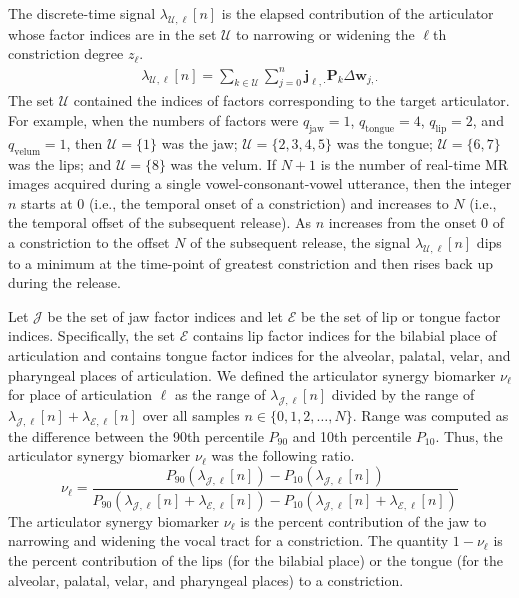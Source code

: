 \documentclass[preprint]{JASAnew}\usepackage[]{graphicx}\usepackage[]{color}
\begin{document}
The discrete-time signal $\lambda_{\mathcal{U},\ell}[n]$ is the elapsed contribution of the articulator whose factor indices are in the set $\mathcal{U}$ to narrowing or widening the $\ell$th constriction degree $z_\ell$. 
\begin{align}
\lambda_{\mathcal{U},\ell} \left[ n \right]
	= \sum_{k\in \mathcal{U}} \sum_{j=0}^{n} \mathbf{j}_{\ell,\cdot} \mathbf{P}_k \Delta \mathbf{w}_{j,\cdot}
\end{align}
The set $\mathcal{U}$ contained the indices of factors corresponding to the target articulator. For example, when the numbers of factors were $q_\text{jaw} = 1$, $q_\text{tongue} = 4$, $q_\text{lip} = 2$, and $q_\text{velum} = 1$, then  $\mathcal{U}=\{1\}$ was the jaw; $\mathcal{U}=\{2,3,4,5\}$ was the tongue; $\mathcal{U}=\{6,7\}$ was the lips; and $\mathcal{U}=\{8\}$ was the velum.
%
If $N+1$ is the number of real-time MR images acquired during a single vowel-consonant-vowel utterance, then the integer $n$ starts at $0$ (i.e., the temporal onset of a constriction) and increases to $N$ (i.e., the temporal offset of the subsequent release). 
%
As $n$ increases from the onset $0$ of a constriction to the offset $N$ of the subsequent release, the signal $\lambda_{\mathcal{U},\ell}[n]$ dips to a minimum at the time-point of greatest constriction and then rises back up during the release.



Let $\mathcal{J}$ be the set of jaw factor indices and let $\mathcal{E}$ be the set of lip or tongue factor indices. Specifically, the set $\mathcal{E}$ contains lip factor indices for the bilabial place of articulation and contains tongue factor indices for the alveolar, palatal, velar, and pharyngeal places of articulation. 
%
We defined the articulator synergy biomarker $\nu_\ell$ for place of articulation $\ell$ as the range of $\lambda_{\mathcal{J},\ell} [ n ]$ divided by the range of $\lambda_{\mathcal{J},\ell} [ n ] + \lambda_{\mathcal{E},\ell} [ n ]$
over all samples $n \in \{0, 1, 2, \ldots, N\}$.
%
Range was computed as the difference between the 90th percentile $P_{90}$ and 10th percentile $P_{10}$. 
%
Thus, the articulator synergy biomarker $\nu_\ell$ was the following ratio.
\begin{equation}
\nu_\ell
=
\frac{P_{90}\left( \lambda_{\mathcal{J},\ell} [n] \right) - P_{10}\left( \lambda_{\mathcal{J},\ell} [n] \right)}
{P_{90}\left( \lambda_{\mathcal{J},\ell} [n] + \lambda_{\mathcal{E},\ell} [n] \right) - P_{10}\left( \lambda_{\mathcal{J},\ell} [n] + \lambda_{\mathcal{E},\ell} [n]\right)}
\end{equation}
%
The articulator synergy biomarker $\nu_\ell$ is the percent contribution of the jaw to narrowing and widening the vocal tract for a constriction. 
%
The quantity $1-\nu_\ell$ is the percent contribution of the lips (for the bilabial place) or the tongue (for the alveolar, palatal, velar, and pharyngeal places) to a constriction. 
\end{document}

